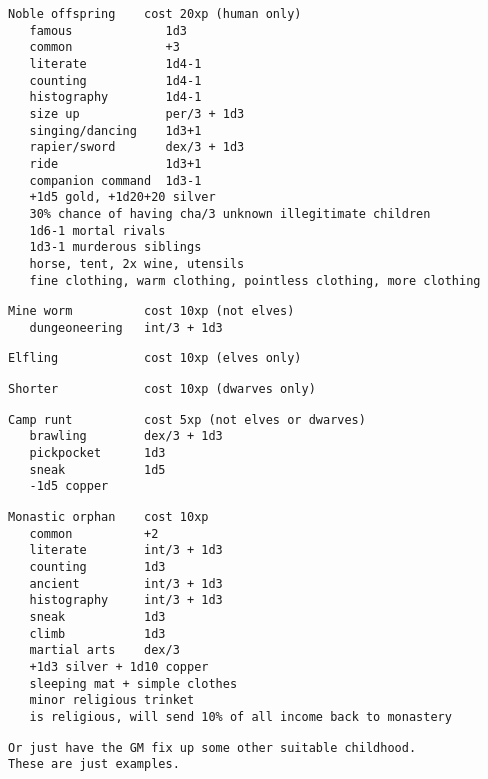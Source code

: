 \pagebreak[1]
\small\begin{samepage}\begin{verbatim}
Noble offspring    cost 20xp (human only)
   famous             1d3
   common             +3
   literate           1d4-1
   counting           1d4-1
   histography        1d4-1
   size up            per/3 + 1d3
   singing/dancing    1d3+1
   rapier/sword       dex/3 + 1d3
   ride               1d3+1
   companion command  1d3-1
   +1d5 gold, +1d20+20 silver
   30% chance of having cha/3 unknown illegitimate children
   1d6-1 mortal rivals
   1d3-1 murderous siblings
   horse, tent, 2x wine, utensils
   fine clothing, warm clothing, pointless clothing, more clothing
\end{verbatim}\end{samepage}\normalsize
\pagebreak[1]
\small\begin{samepage}\begin{verbatim}
Mine worm          cost 10xp (not elves)
   dungeoneering   int/3 + 1d3
\end{verbatim}\end{samepage}\normalsize
\pagebreak[1]
\small\begin{samepage}\begin{verbatim}
Elfling            cost 10xp (elves only)
\end{verbatim}\end{samepage}\normalsize
\pagebreak[1]
\small\begin{samepage}\begin{verbatim}
Shorter            cost 10xp (dwarves only)
\end{verbatim}\end{samepage}\normalsize
\pagebreak[1]
\small\begin{samepage}\begin{verbatim}
Camp runt          cost 5xp (not elves or dwarves)
   brawling        dex/3 + 1d3
   pickpocket      1d3
   sneak           1d5
   -1d5 copper
\end{verbatim}\end{samepage}\normalsize
\pagebreak[1]
\small\begin{samepage}\begin{verbatim}
Monastic orphan    cost 10xp
   common          +2
   literate        int/3 + 1d3
   counting        1d3
   ancient         int/3 + 1d3
   histography     int/3 + 1d3
   sneak           1d3
   climb           1d3
   martial arts    dex/3
   +1d3 silver + 1d10 copper
   sleeping mat + simple clothes
   minor religious trinket
   is religious, will send 10% of all income back to monastery
\end{verbatim}\end{samepage}\normalsize
\pagebreak[1]
\small\begin{samepage}\begin{verbatim}
Or just have the GM fix up some other suitable childhood.
These are just examples.
\end{verbatim}\end{samepage}\normalsize






